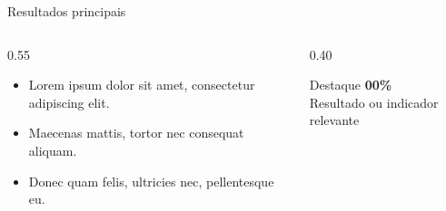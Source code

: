 \begin{frame}{Resultados principais}
  \begin{columns}[T,onlytextwidth]
    \begin{column}{0.55\textwidth}
      \begin{itemize}
        \item Lorem ipsum dolor sit amet, consectetur adipiscing elit.
        \item Maecenas mattis, tortor nec consequat aliquam.
        \item Donec quam felis, ultricies nec, pellentesque eu.
      \end{itemize}
    \end{column}
    \begin{column}{0.40\textwidth}
      \begin{block}{Destaque}
        \centering
        {\Huge\bfseries\color{MalvaDestaque} 00\%}\\[0.3cm]
        Resultado ou indicador relevante
      \end{block}
    \end{column}
  \end{columns}
\end{frame}